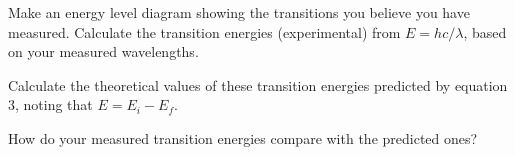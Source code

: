 \eject

Make an energy level diagram showing the transitions you believe you have measured. Calculate the transition energies (experimental) from $E=hc/\lambda$, based on your measured wavelengths.

\answerspace{3.0in}

Calculate the theoretical values of these transition energies predicted by equation 3, noting that $E = E_i - E_f$.

\answerspace{3.0in}

How do your measured transition energies compare with the predicted ones?
\answerspace{1.0in}
